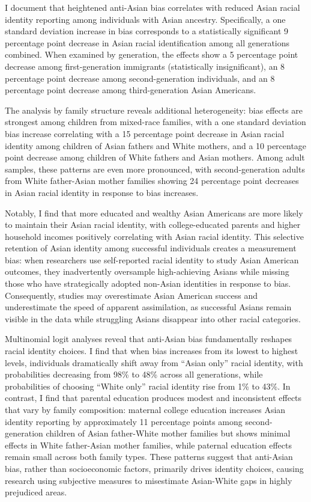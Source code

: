 I document that heightened anti-Asian bias correlates with reduced Asian racial identity reporting among individuals with Asian ancestry. Specifically, a one standard deviation increase in bias corresponds to a statistically significant 9 percentage point decrease in Asian racial identification among all generations combined. When examined by generation, the effects show a 5 percentage point decrease among first-generation immigrants (statistically insignificant), an 8 percentage point decrease among second-generation individuals, and an 8 percentage point decrease among third-generation Asian Americans.

The analysis by family structure reveals additional heterogeneity: bias effects are strongest among children from mixed-race families, with a one standard deviation bias increase correlating with a 15 percentage point decrease in Asian racial identity among children of Asian fathers and White mothers, and a 10 percentage point decrease among children of White fathers and Asian mothers. Among adult samples, these patterns are even more pronounced, with second-generation adults from White father-Asian mother families showing 24 percentage point decreases in Asian racial identity in response to bias increases.

Notably, I find that more educated and wealthy Asian Americans are more likely to maintain their Asian racial identity, with college-educated parents and higher household incomes positively correlating with Asian racial identity. This selective retention of Asian identity among successful individuals creates a measurement bias: when researchers use self-reported racial identity to study Asian American outcomes, they inadvertently oversample high-achieving Asians while missing those who have strategically adopted non-Asian identities in response to bias. Consequently, studies may overestimate Asian American success and underestimate the speed of apparent assimilation, as successful Asians remain visible in the data while struggling Asians disappear into other racial categories.

Multinomial logit analyses reveal that anti-Asian bias fundamentally reshapes racial identity choices. I find that when bias increases from its lowest to highest levels, individuals dramatically shift away from ``Asian only'' racial identity, with probabilities decreasing from 98\% to 48\% across all generations, while probabilities of choosing ``White only'' racial identity rise from 1\% to 43\%. In contrast, I find that parental education produces modest and inconsistent effects that vary by family composition: maternal college education increases Asian identity reporting by approximately 11 percentage points among second-generation children of Asian father-White mother families but shows minimal effects in White father-Asian mother families, while paternal education effects remain small across both family types. These patterns suggest that anti-Asian bias, rather than socioeconomic factors, primarily drives identity choices, causing research using subjective measures to misestimate Asian-White gaps in highly prejudiced areas.

